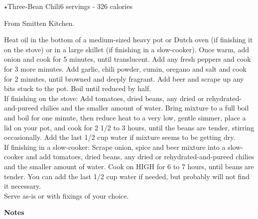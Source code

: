 \begin{recipe}{$\star$Three-Bean Chili}{6 servings - 326 calories}{}

\freeform From Smitten Kitchen.


Heat oil in the bottom of a medium-sized heavy pot or Dutch oven (if finishing it on the stove) or in a large skillet (if finishing in a slow-cooker). Once warm, add onion and cook for 5 minutes, until translucent. Add any fresh peppers and cook for 3 more minutes. Add garlic, chili powder, cumin, oregano and salt and cook for 2 minutes, until browned and deeply fragrant. Add beer and scrape up any bits stuck to the pot. Boil until reduced by half.\\

If finishing on the stove: Add tomatoes, dried beans, any dried or rehydrated-and-pureed chilies and the smaller amount of water. Bring mixture to a full boil and boil for one minute, then reduce heat to a very low, gentle simmer, place a lid on your pot, and cook for 2 1/2 to 3 hours, until the beans are tender, stirring occasionally. Add the last 1/2 cup water if mixture seems to be getting dry.\\

If finishing in a slow-cooker: Scrape onion, spice and beer mixture into a slow-cooker and add tomatoes, dried beans, any dried or rehydrated-and-pureed chilies and the smaller amount of water. Cook on HIGH for 6 to 7 hours, until beans are tender. You can add the last 1/2 cup water if needed, but probably will not find it necessary.\\

Serve as-is or with fixings of your choice.\newpage

\textbf{Notes}


\end{recipe}
